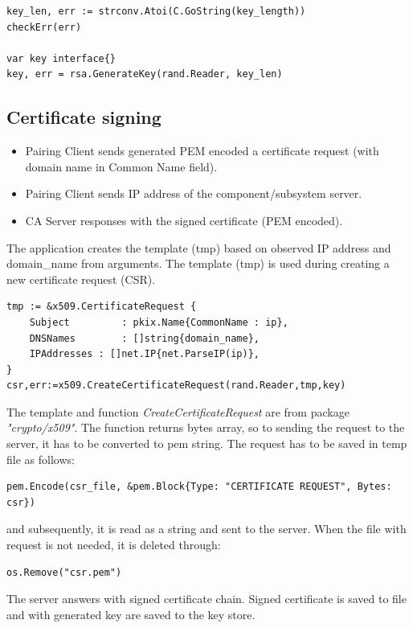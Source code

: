 \documentclass[
  digital, %
  notable,   %
  lof,     %
  lot,     %
]{fithesis3}
\begin{document}
\begin{lstlisting}
key_len, err := strconv.Atoi(C.GoString(key_length))	
checkErr(err)

var key interface{}
key, err = rsa.GenerateKey(rand.Reader, key_len)
\end{lstlisting}
    
\subsection{Certificate signing}
\begin{itemize}[leftmargin=2em,rightmargin=1em,itemsep=0.75\parskip,parsep=0em,topsep=0em,partopsep=0em]
\item Pairing Client sends generated PEM encoded a certificate request (with domain name in Common Name field).
\item Pairing Client sends IP address of the component/subsystem server.
\item CA Server responses with the signed certificate (PEM encoded).
\end{itemize}

The application creates the template (tmp) based on observed IP address and domain\_name from 
arguments. The template (tmp) is used during creating a new certificate request (CSR). 

\begin{lstlisting}
tmp := &x509.CertificateRequest {
	Subject 		: pkix.Name{CommonName : ip},
	DNSNames 		: []string{domain_name},
	IPAddresses : []net.IP{net.ParseIP(ip)},
}
csr,err:=x509.CreateCertificateRequest(rand.Reader,tmp,key)
\end{lstlisting}

The template and function \textit{CreateCertificateRequest} are from package 
\textit{"crypto/x509"}. The function returns bytes array, so to sending the request to the server, 
it has to be converted to pem string. The request has to be saved in temp file as follows:
\begin{lstlisting}
pem.Encode(csr_file, &pem.Block{Type: "CERTIFICATE REQUEST", Bytes: csr})
\end{lstlisting}
and subsequently, it is read as a string and sent to the server. When the file with request is not 
needed, it is deleted through:
\begin{lstlisting}
os.Remove("csr.pem")
\end{lstlisting}
The server answers with signed certificate chain. Signed certificate is saved to file and with 
generated key are saved to the key store.
\end{document}

